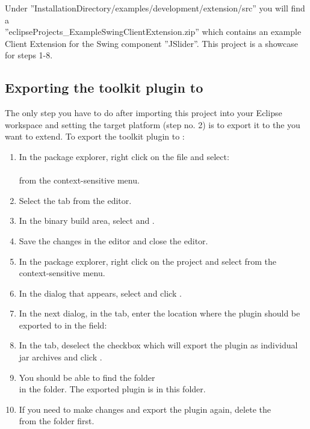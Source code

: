 Under ''InstallationDirectory/examples/development/extension/src''
you will find a \\ ''eclipseProjects\_ExampleSwingClientExtension.zip'' which contains
 an example \app{} Client Extension for the Swing component ''JSlider''. This project 
 is a showcase for steps 1-8.
 
\subsection{Exporting the toolkit plugin to \app{}}
 The only step you have to do after importing this project into your Eclipse workspace and 
 setting the target platform (step no. 2) is to export it to the \app{} you want to 
 extend. To export the toolkit plugin to \app{}:

\begin{enumerate}
\item In the package explorer, right click on the  file and select:\\
\\
from the context-sensitive menu.
\item Select the  tab from the editor.
\item In the binary build area, select  and .
\item Save the changes in the editor and close the editor. 
\item In the package explorer, right click on the project and select  from the context-sensitive menu.
\item In the dialog that appears, select  and click .
\item In the next dialog, in the  tab, enter the location where the plugin should be exported to in the  field:\\
\item In the  tab, deselect the checkbox which will export the plugin as individual jar archives and click .
\item You should be able to find the folder \\  in the  folder. The exported plugin is in this folder. 
\item If you need to make changes and export the plugin again, delete the \\  from the  folder first.
\end{enumerate}

